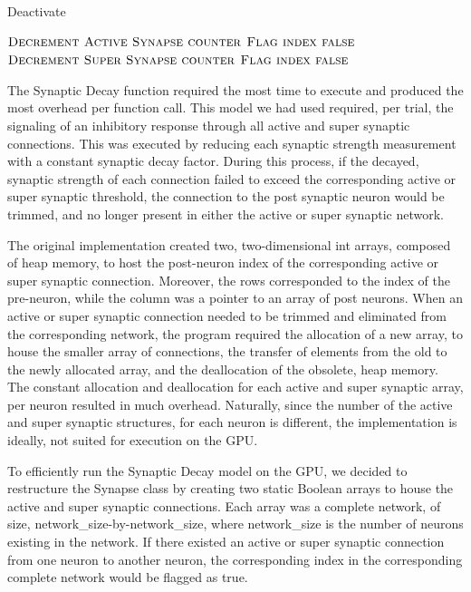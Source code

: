 \documentclass[a4paper]{article}
\begin{document}
\begin{algorithm}[H]
\caption{Deactivate}
\label{alg:deactivate}
\begin{algorithmic}
	\State $\textsc{Decrement Active Synapse counter}$
	\State $\textsc{Flag index false}$
	\State $\textsc{Decrement Super Synapse counter}$
	\State $\textsc{Flag index false}$
\EndIf
\end{algorithmic}
\end{algorithm}

The Synaptic Decay function required the most time to execute and produced the most overhead per function call. This model we had used required, per trial, the signaling of an inhibitory response through all active and super synaptic connections. This was executed by reducing each synaptic strength measurement with a constant synaptic decay factor. During this process, if the decayed, synaptic strength of each connection failed to exceed the corresponding active or super synaptic threshold, the connection to the post synaptic neuron would be trimmed, and no longer present in either the active or super synaptic network.

The original implementation created two, two-dimensional int arrays, composed of heap memory, to host the post-neuron index of the corresponding active or super synaptic connection. Moreover, the rows corresponded to the index of the pre-neuron, while the column was a pointer to an array of post neurons. When an active or super synaptic connection needed to be trimmed and eliminated from the corresponding network, the program required the allocation of a new array, to house the smaller array of connections, the transfer of elements from the old to the newly allocated array, and the deallocation of the obsolete, heap memory. The constant allocation and deallocation for each active and super synaptic array, per neuron resulted in much overhead. Naturally, since the number of the active and super synaptic structures, for each neuron is different, the implementation is ideally, not suited for execution on the GPU. 

To efficiently run the Synaptic Decay model on the GPU, we decided to restructure the Synapse class by creating two static Boolean arrays to house the active and super synaptic connections. Each array was a complete network, of size, network\_size-by-network\_size, where network\_size is the number of neurons existing in the network. If there existed an active or super synaptic connection from one neuron to another neuron, the corresponding index in the corresponding complete network would be flagged as true. 
\end{document}
